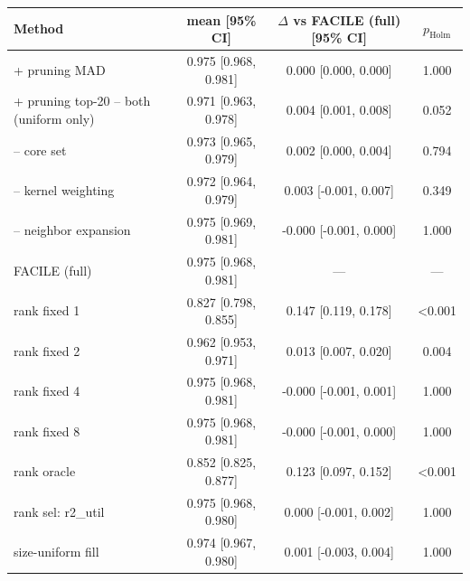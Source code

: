 \begin{tabular}{lccc}
\toprule
Method & mean [95\% CI] & $\Delta$ vs FACILE (full) [95\% CI] & $p_{\mathrm{Holm}}$ \\
\midrule
+ pruning MAD & 0.975 [0.968, 0.981] & 0.000 [0.000, 0.000] & 1.000 \\
+ pruning top-20%
-- both (uniform only) & 0.971 [0.963, 0.978] & 0.004 [0.001, 0.008] & 0.052 \\
-- core set & 0.973 [0.965, 0.979] & 0.002 [0.000, 0.004] & 0.794 \\
-- kernel weighting & 0.972 [0.964, 0.979] & 0.003 [-0.001, 0.007] & 0.349 \\
-- neighbor expansion & 0.975 [0.969, 0.981] & -0.000 [-0.001, 0.000] & 1.000 \\
FACILE (full) & 0.975 [0.968, 0.981] & --- & --- \\
rank fixed 1 & 0.827 [0.798, 0.855] & 0.147 [0.119, 0.178] & <0.001 \\
rank fixed 2 & 0.962 [0.953, 0.971] & 0.013 [0.007, 0.020] & 0.004 \\
rank fixed 4 & 0.975 [0.968, 0.981] & -0.000 [-0.001, 0.001] & 1.000 \\
rank fixed 8 & 0.975 [0.968, 0.981] & -0.000 [-0.001, 0.000] & 1.000 \\
rank oracle & 0.852 [0.825, 0.877] & 0.123 [0.097, 0.152] & <0.001 \\
rank sel: r2_util & 0.975 [0.968, 0.980] & 0.000 [-0.001, 0.002] & 1.000 \\
size-uniform fill & 0.974 [0.967, 0.980] & 0.001 [-0.003, 0.004] & 1.000 \\
\bottomrule
\end{tabular}

